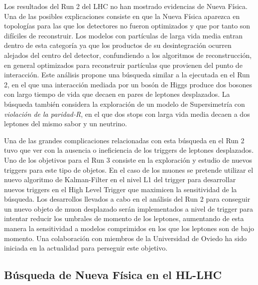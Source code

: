 Los resultados del Run 2 del LHC no han mostrado evidencias de Nueva Física. Una de las posibles explicaciones consiste en que la Nueva Física aparezca en topologías para las que los detectores no fueron optimizados y que por tanto son difíciles de reconstruir. Los modelos con partículas de larga vida media entran dentro de esta categoría ya que los productos de su desintegración ocurren alejados del centro del detector, confundiendo a los algoritmos de reconstrucción, en general optimizados para reconstruir partículas que provienen del punto de interacción. Este análisis propone una búsqueda similar a la ejecutada en el Run 2, en el que una interacción mediada por un bosón de Higgs produce dos bosones con largo tiempo de vida que decaen en pares de leptones desplazados. La búsqueda también considera la exploración de un modelo de Supersimetría con \emph{violación de la paridad-R}, en el que dos stops con larga vida media decaen a dos leptones del mismo sabor y un neutrino. 

Una de las grandes complicaciones relacionadas con esta búsqueda en el Run 2 tuvo que ver con la ausencia o ineficiencia de los triggers de leptones desplazados. Uno de los objetivos para el Run 3 consiste en la exploración y estudio de nuevos triggers para este tipo de objetos. En el caso de los muones se pretende utilizar el nuevo algoritmo de Kalman-Filter en el nivel L1 del trigger para desarrollar nuevos triggers en el High Level Trigger que maximicen la sensitividad de la búsqueda. Los desarrollos llevados a cabo en el análisis del Run 2 para conseguir un nuevo objeto de muon desplazado serán implementados a nivel de trigger para intentar reducir los umbrales de momento de los leptones, aumentando de esta manera la sensitividad a modelos comprimidos en los que los leptones son de bajo momento. Una colaboración con miembros de la Universidad de Oviedo ha sido iniciada en la actualidad para perseguir este objetivo. 

\subsection{Búsqueda de Nueva Física en el HL-LHC}

